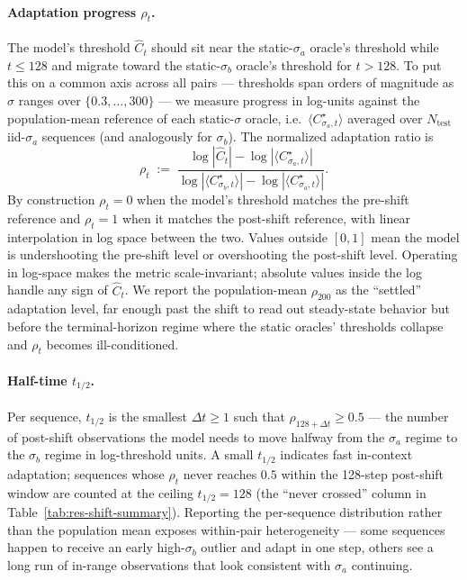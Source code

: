 \documentclass[11pt]{article}
\begin{document}
\paragraph{Adaptation progress $\rho_t$.} The model's threshold $\widehat C_t$ should sit near the static-$\sigma_a$ oracle's threshold while $t \le 128$ and migrate toward the static-$\sigma_b$ oracle's threshold for $t > 128$. To put this on a common axis across all pairs --- thresholds span orders of magnitude as $\sigma$ ranges over $\{0.3, \ldots, 300\}$ --- we measure progress in log-units against the population-mean reference of each static-$\sigma$ oracle, i.e.\ $\langle C^\star_{\sigma_a, t}\rangle$ averaged over $N_{\mathrm{test}}$ iid-$\sigma_a$ sequences (and analogously for $\sigma_b$). The normalized adaptation ratio is
\[
\rho_t \;:=\; \frac{\log |\widehat C_t| - \log |\langle C^\star_{\sigma_a, t}\rangle|}{\log |\langle C^\star_{\sigma_b, t}\rangle| - \log |\langle C^\star_{\sigma_a, t}\rangle|}.
\]
By construction $\rho_t = 0$ when the model's threshold matches the pre-shift reference and $\rho_t = 1$ when it matches the post-shift reference, with linear interpolation in log space between the two. Values outside $[0, 1]$ mean the model is undershooting the pre-shift level or overshooting the post-shift level. Operating in log-space makes the metric scale-invariant; absolute values inside the log handle any sign of $\widehat C_t$. We report the population-mean $\rho_{200}$ as the ``settled'' adaptation level, far enough past the shift to read out steady-state behavior but before the terminal-horizon regime where the static oracles' thresholds collapse and $\rho_t$ becomes ill-conditioned.

\paragraph{Half-time $t_{1/2}$.} Per sequence, $t_{1/2}$ is the smallest $\Delta t \ge 1$ such that $\rho_{128 + \Delta t} \ge 0.5$ --- the number of post-shift observations the model needs to move halfway from the $\sigma_a$ regime to the $\sigma_b$ regime in log-threshold units. A small $t_{1/2}$ indicates fast in-context adaptation; sequences whose $\rho_t$ never reaches $0.5$ within the 128-step post-shift window are counted at the ceiling $t_{1/2} = 128$ (the ``never crossed'' column in Table~\ref{tab:res-shift-summary}). Reporting the per-sequence distribution rather than the population mean exposes within-pair heterogeneity --- some sequences happen to receive an early high-$\sigma_b$ outlier and adapt in one step, others see a long run of in-range observations that look consistent with $\sigma_a$ continuing.
\end{document}

